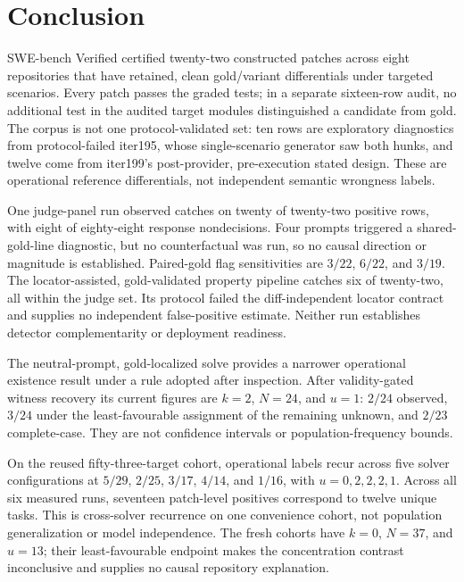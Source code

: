 \documentclass[11pt]{article}
\begin{document}
\section{Conclusion}

SWE-bench Verified certified twenty-two constructed patches across eight repositories that have retained,
clean gold/variant differentials under targeted scenarios. Every patch passes the graded tests; in a
separate sixteen-row audit, no additional test in the audited target modules distinguished a candidate from
gold. The corpus is not one protocol-validated set: ten rows are exploratory diagnostics from
protocol-failed iter195, whose single-scenario generator saw both hunks, and twelve come from iter199's
post-provider, pre-execution stated design. These are operational reference differentials, not independent
semantic wrongness labels.

One judge-panel run observed catches on twenty of twenty-two positive rows, with eight of eighty-eight
response nondecisions. Four prompts triggered a shared-gold-line diagnostic, but no counterfactual was run,
so no causal direction or magnitude is established. Paired-gold flag sensitivities are $3/22$, $6/22$, and
$3/19$. The locator-assisted, gold-validated property pipeline catches six of twenty-two, all within the
judge set. Its protocol failed the diff-independent locator contract and supplies no independent
false-positive estimate. Neither run establishes detector complementarity or deployment readiness.

The neutral-prompt, gold-localized solve provides a narrower operational existence result under a rule adopted
after inspection. After validity-gated witness recovery its current figures are $k=2$, $N=24$, and $u=1$:
$2/24$ observed, $3/24$ under the least-favourable assignment of the remaining unknown, and $2/23$
complete-case. They are not confidence intervals or population-frequency bounds.

On the reused fifty-three-target cohort, operational labels recur across five solver configurations at
$5/29$, $2/25$, $3/17$, $4/14$, and $1/16$, with $u=0,2,2,2,1$. Across all six measured runs, seventeen
patch-level positives correspond to twelve unique tasks. This is cross-solver recurrence on one convenience
cohort, not population generalization or model independence. The fresh cohorts have $k=0$, $N=37$, and
$u=13$; their least-favourable endpoint makes the concentration contrast inconclusive and supplies no causal
repository explanation.
\end{document}
